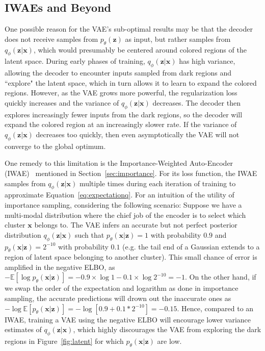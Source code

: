 \documentclass{article}
\begin{document}
\subsection{IWAEs and Beyond}
One possible reason for the VAE's sub-optimal results may be that the decoder does not receive samples from $p_\theta(\mathbf{z})$ as input, but rather samples from $q_\phi(\mathbf{z}|\mathbf{x})$, which would presumably be centered around colored regions of the latent space.
During early phases of training, $q_\phi(\mathbf{z}|\mathbf{x})$ has high variance, allowing the decoder to encounter inputs sampled from dark regions and ``explore" the latent space, which in turn allows it to learn to expand the colored regions.
However, as the VAE grows more powerful, the regularization loss quickly increases and the variance of $q_\phi(\mathbf{z}|\mathbf{x})$ decreases. The decoder then explores increasingly fewer inputs from the dark regions, so the decoder will expand the colored region at an increasingly slower rate.
If the variance of $q_\phi(\mathbf{z}|\mathbf{x})$  decreases too quickly, then even asymptotically the VAE will not converge to the global optimum.


One remedy to this limitation is the Importance-Weighted Auto-Encoder (IWAE)~\cite{burda2015importance} mentioned in Section~\ref{sec:importance}.  For its loss function, the IWAE samples from $q_\phi(\mathbf{z}|\mathbf{x})$ multiple times during each iteration of training to approximate Equation~\ref{eq:expectationq}.
For an intuition of  the utility of importance sampling, considering the following scenario: 
Suppose we have a multi-modal distribution where the chief job of the encoder is to select which cluster $\mathbf{x}$ belongs to. The VAE infers an accurate but not perfect posterior distribution $q_\phi(\mathbf{z}|\mathbf{x})$ such that $p_\theta(\mathbf{x}|\mathbf{z})=1$ with probability $0.9$ and $p_\theta(\mathbf{x}|\mathbf{z})=2^{-10}$ with probability $0.1$ (e.g. the tail end of a Gaussian extends to a region of latent space belonging to another cluster). This small chance of error is amplified in the negative ELBO, as  $-\mathbb{E}[ \log p_\theta(\mathbf{x}|\mathbf{z})] = -0.9 \times \log 1 - 0.1 \times \log 2^{-10} = -1$. On the other hand, if we swap the order of the expectation and logarithm as done in importance sampling, the accurate predictions will drown out the inaccurate ones as $- \log \mathbb{E}[ p_\theta(\mathbf{x}|\mathbf{z}) ] = -\log [0.9+0.1*2^{-10}] = -0.15$.
Hence, compared to an IWAE, training a  VAE using the negative ELBO will encourage lower variance estimates of $q_\phi(\mathbf{z}|\mathbf{x})$, which highly discourages the VAE from exploring the dark regions in Figure~\ref{fig:latent} for which $p_\theta(\mathbf{x}|\mathbf{z})$ are low.
\end{document}
